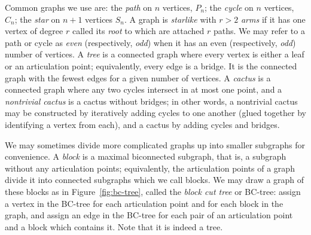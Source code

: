 \documentclass{amsart}
\theoremstyle{definition}
\begin{document}
Common graphs we use are: the \emph{path} on $n$ vertices, $P_n$; the \emph{cycle} on $n$ vertices, $C_n$; the \emph{star} on $n+1$ vertices $S_n$. A graph is \emph{starlike} with $r>2$ \emph{arms} if it has one vertex of degree $r$ called its \emph{root} to which are attached $r$ paths. We may refer to a path or cycle as \emph{even} (respectively, \emph{odd}) when it has an even (respectively, \emph{odd}) number of vertices. A \emph{tree} is a connected graph where every vertex is either a leaf or an articulation point; equivalently, every edge is a bridge. It is the connected graph with the fewest edges for a given number of vertices. A \emph{cactus} is a connected graph where any two cycles intersect in at most one point, and a \emph{nontrivial cactus} is a cactus without bridges; in other words, a nontrivial cactus may be constructed by iteratively adding cycles to one another (glued together by identifying a vertex from each), and a cactus by adding cycles and bridges. 

We may sometimes divide more complicated graphs up into smaller subgraphs for convenience. A \emph{block} is a maximal biconnected subgraph, that is, a subgraph without any articulation points; equivalently, the articulation points of a graph divide it into connected subgraphs which we call blocks. We may draw a graph of these blocks as in Figure~\ref{fig:bc-tree}, called the \emph{block cut tree} or {BC-tree}: assign a vertex in the BC-tree for each articulation point and for each block in the graph, and assign an edge in the BC-tree for each pair of an articulation point and a block which contains it. Note that it is indeed a tree.
\end{document}
